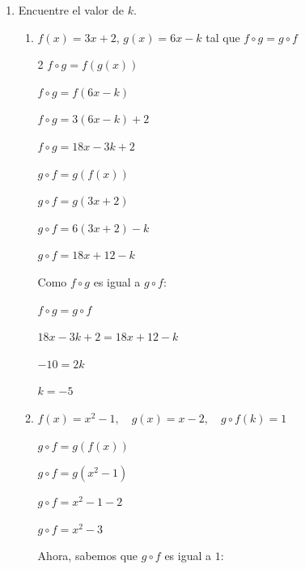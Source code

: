 \documentclass{article}
\begin{document}
\begin{enumerate}
\begin{enumerate}
\begin{enumerate}
                \(Dom_{g \circ f} = \mathbb{R} \setminus \{-1\} \)
            \end{enumerate}
    \end{enumerate}
    \vspace{\baselineskip}
    
\item[37.] Encuentre el valor de \(k\).
    \begin{enumerate}
        \item[a)] \(f(x) = 3x + 2\), \(g(x) = 6x - k\) tal que \(f \circ g = g \circ f\)
        \begin{multicols}{2}
            \( f \circ g = f(g(x)) \)
            
            \( f \circ g = f(6x - k) \)
            
            \( f \circ g = 3(6x - k) + 2 \)
            
            \( f \circ g = 18x - 3k + 2 \)
            \columnbreak

            \( g \circ f = g(f(x)) \)
            
            \( g \circ f = g(3x + 2) \)
            
            \( g \circ f = 6(3x + 2) - k \)
            
            \( g \circ f = 18x + 12 - k \)
        \end{multicols}

        Como \(f \circ g\) es igual a \(g \circ f\):
        
        \(f \circ g = g \circ f\)
        
        \(18x - 3k + 2 = 18x + 12 - k\)
        
        \(-10 = 2k\)
        
        \(k = -5\)
        \vspace{\baselineskip}
        
        \item[b)] \(f(x) = x^2 - 1, \quad g(x) = x - 2, \quad g \circ f(k) = 1\)

        \(g \circ f = g(f(x))\)
        
        \(g \circ f = g(x^2 - 1)\)
        
        \(g \circ f = x^2 - 1 - 2\)
        
        \(g \circ f = x^2 - 3\)
        \vspace{\baselineskip}

        Ahora, sabemos que \(g \circ f\) es igual a \(1\):
        

\end{enumerate}
\end{enumerate}
\end{document}

